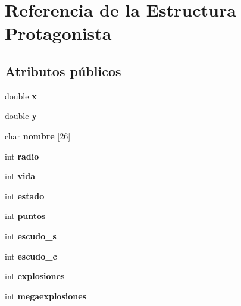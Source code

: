 \hypertarget{struct_protagonista}{}\section{Referencia de la Estructura Protagonista}
\label{struct_protagonista}
\subsection*{Atributos públicos}
\begin{DoxyCompactItemize}
\item 
double {\bfseries x}\hypertarget{struct_protagonista_a2d1a4d6c3177b2d1fdff58ad15621e9e}{}\label{struct_protagonista_a2d1a4d6c3177b2d1fdff58ad15621e9e}

\item 
double {\bfseries y}\hypertarget{struct_protagonista_a8b5aa56a60dbf2c60e6582b458cfcdde}{}\label{struct_protagonista_a8b5aa56a60dbf2c60e6582b458cfcdde}

\item 
char {\bfseries nombre} \mbox{[}26\mbox{]}\hypertarget{struct_protagonista_a8806db0e1e79a2094f5baab175d6ed21}{}\label{struct_protagonista_a8806db0e1e79a2094f5baab175d6ed21}

\item 
int {\bfseries radio}\hypertarget{struct_protagonista_a2d1dea474375846a2e2603f32035316d}{}\label{struct_protagonista_a2d1dea474375846a2e2603f32035316d}

\item 
int {\bfseries vida}\hypertarget{struct_protagonista_a116b72133b37591f7d751a8e8f7591cc}{}\label{struct_protagonista_a116b72133b37591f7d751a8e8f7591cc}

\item 
int {\bfseries estado}\hypertarget{struct_protagonista_aacc03322baf868ada6a43180c8acdc12}{}\label{struct_protagonista_aacc03322baf868ada6a43180c8acdc12}

\item 
int {\bfseries puntos}\hypertarget{struct_protagonista_a032900f5b46d1f600e587fcf9896d4f0}{}\label{struct_protagonista_a032900f5b46d1f600e587fcf9896d4f0}

\item 
int {\bfseries escudo\+\_\+s}\hypertarget{struct_protagonista_af42fbd83b3dbd371af36181b426085cb}{}\label{struct_protagonista_af42fbd83b3dbd371af36181b426085cb}

\item 
int {\bfseries escudo\+\_\+c}\hypertarget{struct_protagonista_ab2ad9d18fa7ff20b4e1f3044964c2d49}{}\label{struct_protagonista_ab2ad9d18fa7ff20b4e1f3044964c2d49}

\item 
int {\bfseries explosiones}\hypertarget{struct_protagonista_a65367a087cbdebe3360783df755314ae}{}\label{struct_protagonista_a65367a087cbdebe3360783df755314ae}

\item 
int {\bfseries megaexplosiones}\hypertarget{struct_protagonista_a52fc2de932d830c73c56ebe2ca8850e4}{}\label{struct_protagonista_a52fc2de932d830c73c56ebe2ca8850e4}

\end{DoxyCompactItemize}


